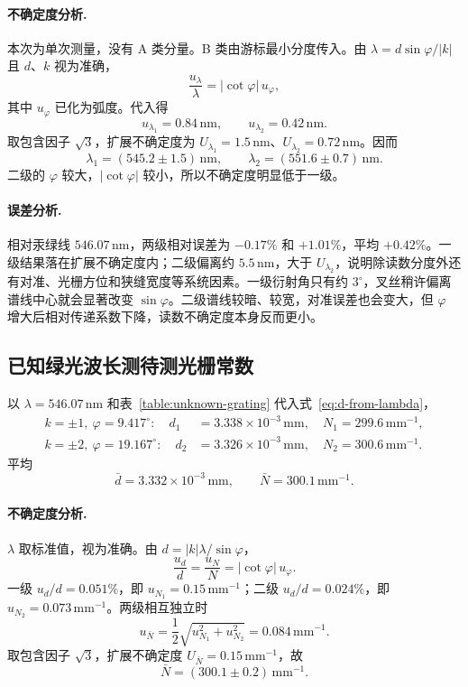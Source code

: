 \documentclass{../template/myrpt}
\begin{document}
\paragraph{不确定度分析.}
本次为单次测量，没有 A 类分量。B 类由游标最小分度传入。由 $\lambda=d\sin\varphi/\lvert k\rvert$ 且 $d$、$k$ 视为准确，
\[
  \frac{u_\lambda}{\lambda}=\lvert\cot\varphi\rvert\,u_\varphi,
\]
其中 $u_\varphi$ 已化为弧度。代入得
\[
  u_{\lambda_1}=0.84\,\si{\nano\metre},\qquad
  u_{\lambda_2}=0.42\,\si{\nano\metre}.
\]
取包含因子 $\sqrt{3}$，扩展不确定度为 $U_{\lambda_1}=1.5\,\si{\nano\metre}$、$U_{\lambda_2}=0.72\,\si{\nano\metre}$。因而
\[
  \lambda_1=(545.2\pm1.5)\,\si{\nano\metre},\qquad
  \lambda_2=(551.6\pm0.7)\,\si{\nano\metre}.
\]
二级的 $\varphi$ 较大，$\lvert\cot\varphi\rvert$ 较小，所以不确定度明显低于一级。

\paragraph{误差分析.}
相对汞绿线 $546.07\,\si{\nano\metre}$，两级相对误差为 $-0.17\%$ 和 $+1.01\%$，平均 $+0.42\%$。一级结果落在扩展不确定度内；二级偏离约 $5.5\,\si{\nano\metre}$，大于 $U_{\lambda_2}$，说明除读数分度外还有对准、光栅方位和狭缝宽度等系统因素。一级衍射角只有约 $3^\circ$，叉丝稍许偏离谱线中心就会显著改变 $\sin\varphi$。二级谱线较暗、较宽，对准误差也会变大，但 $\varphi$ 增大后相对传递系数下降，读数不确定度本身反而更小。

\subsection{已知绿光波长测待测光栅常数}

以 $\lambda=546.07\,\si{\nano\metre}$ 和表~\ref{table:unknown-grating} 代入式~\eqref{eq:d-from-lambda}，
\begin{align*}
  k=\pm1,\ \varphi=9.417^\circ:\quad
  d_1&=3.338\times10^{-3}\,\si{\milli\metre},
  \quad N_1=299.6\,\mathrm{mm}^{-1},\\
  k=\pm2,\ \varphi=19.167^\circ:\quad
  d_2&=3.326\times10^{-3}\,\si{\milli\metre},
  \quad N_2=300.6\,\mathrm{mm}^{-1}.
\end{align*}
平均
\[
  \bar d=3.332\times10^{-3}\,\si{\milli\metre},\qquad
  \bar N=300.1\,\mathrm{mm}^{-1}.
\]

\paragraph{不确定度分析.}
$\lambda$ 取标准值，视为准确。由 $d=\lvert k\rvert\lambda/\sin\varphi$，
\[
  \frac{u_d}{d}=\frac{u_N}{N}=\lvert\cot\varphi\rvert\,u_\varphi.
\]
一级 $u_d/d=0.051\%$，即 $u_{N_1}=0.15\,\mathrm{mm}^{-1}$；二级 $u_d/d=0.024\%$，即 $u_{N_2}=0.073\,\mathrm{mm}^{-1}$。两级相互独立时
\[
  u_{\bar N}=\frac12\sqrt{u_{N_1}^2+u_{N_2}^2}=0.084\,\mathrm{mm}^{-1}.
\]
取包含因子 $\sqrt{3}$，扩展不确定度 $U_{\bar N}=0.15\,\mathrm{mm}^{-1}$，故
\[
  \bar N=(300.1\pm0.2)\,\mathrm{mm}^{-1}.
\]
\end{document}
